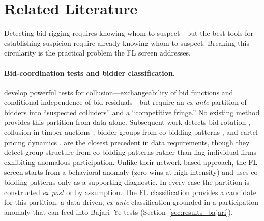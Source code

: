\section{Related Literature}
\label{sec:literature}

Detecting bid rigging requires knowing whom to suspect---but the
best tools for establishing suspicion require already knowing whom
to suspect. Breaking this circularity is the practical problem the
FL screen addresses.

\paragraph{Bid-coordination tests and bidder classification.}
\citet{bajari2003deciding} develop powerful tests for
collusion---exchangeability of bid functions and conditional
independence of bid residuals---but require an \emph{ex ante}
partition of bidders into ``suspected colluders'' and a ``competitive
fringe.'' No existing method provides this partition from data alone.
Subsequent work detects bid rotation
\citep{porter1993detection, porter1999ohio}, collusion in timber
auctions \citep{baldwin1997bidder}, bidder groups from co-bidding
patterns \citep{conley2016detecting}, and cartel pricing dynamics
\citep{clark2014explicit, schurter2020identification}. \citet{conley2016detecting} are the
closest precedent in data requirements, though they detect group
structure from co-bidding patterns rather than flag individual firms
exhibiting anomalous participation. Unlike their network-based
approach, the FL screen starts from a behavioral anomaly (zero wins
at high intensity) and uses co-bidding patterns only as a supporting
diagnostic. In every case the partition is constructed \emph{ex post}
or by assumption. The FL classification provides a candidate for this
partition: a data-driven, \emph{ex ante} classification grounded in a
participation anomaly that can feed into Bajari--Ye tests
(Section~\ref{sec:results_bajari}).

